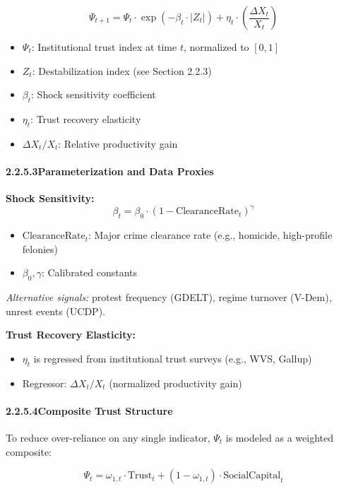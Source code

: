 \documentclass[12pt]{report}
\begin{document}
\[
\Psi_{t+1} = \Psi_t \cdot \exp(-\beta_t \cdot |Z_t|) + \eta_t \cdot \left( \frac{\Delta X_t}{X_t} \right)
\]

\begin{itemize}
  \item $\Psi_t$: Institutional trust index at time $t$, normalized to $[0,1]$
  \item $Z_t$: Destabilization index (see Section 2.2.3)
  \item $\beta_t$: Shock sensitivity coefficient
  \item $\eta_t$: Trust recovery elasticity
  \item $\Delta X_t / X_t$: Relative productivity gain
\end{itemize}

\paragraph{2.2.5.3\quad Parameterization and Data Proxies}

\textbf{Shock Sensitivity:}
\[
\beta_t = \beta_0 \cdot (1 - \text{ClearanceRate}_t)^\gamma
\]
\begin{itemize}
  \item $\text{ClearanceRate}_t$: Major crime clearance rate (e.g., homicide, high-profile felonies)
  \item $\beta_0, \gamma$: Calibrated constants
\end{itemize}

\textit{Alternative signals:} protest frequency (GDELT), regime turnover (V-Dem), unrest events (UCDP).

\textbf{Trust Recovery Elasticity:}
\begin{itemize}
  \item $\eta_t$ is regressed from institutional trust surveys (e.g., WVS, Gallup)
  \item Regressor: $\Delta X_t / X_t$ (normalized productivity gain)
\end{itemize}

\paragraph{2.2.5.4\quad Composite Trust Structure}

To reduce over-reliance on any single indicator, $\Psi_t$ is modeled as a weighted composite:

\[
\Psi_t = \omega_{1,t} \cdot \text{Trust}_t + (1 - \omega_{1,t}) \cdot \text{SocialCapital}_t
\]
\end{document}
